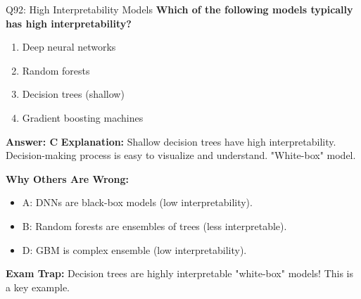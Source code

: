 \documentclass[8pt]{beamer}
\begin{document}
	\begin{frame}{Q92: High Interpretability Models}
		\fontsize{6.5}{7.5}\selectfont
		\textbf{Which of the following models typically has high interpretability?}
		
		\begin{enumerate}
			\item Deep neural networks
			\item Random forests
			\item Decision trees (shallow)
			\item Gradient boosting machines
		\end{enumerate}
		
		\vspace{0.05cm}
		\textcolor{myblue}{\textbf{Answer: C}}
		\vspace{0.05cm}
		\textcolor{myblue}{\textbf{Explanation:}} Shallow decision trees have high interpretability. Decision-making process is easy to visualize and understand. "White-box" model.
		
		\vspace{0.05cm}
		\textcolor{myred}{\textbf{Why Others Are Wrong:}}
		\begin{itemize}
			\item \textcolor{myred}{A:} DNNs are black-box models (low interpretability).
			\item \textcolor{myred}{B:} Random forests are ensembles of trees (less interpretable).
			\item \textcolor{myred}{D:} GBM is complex ensemble (low interpretability).
		\end{itemize}
		
		\textcolor{myred}{\textbf{Exam Trap:}} \textcolor{myblue}{Decision trees} are highly interpretable "white-box" models! This is a key example.
	\end{frame}
	
\end{document}
